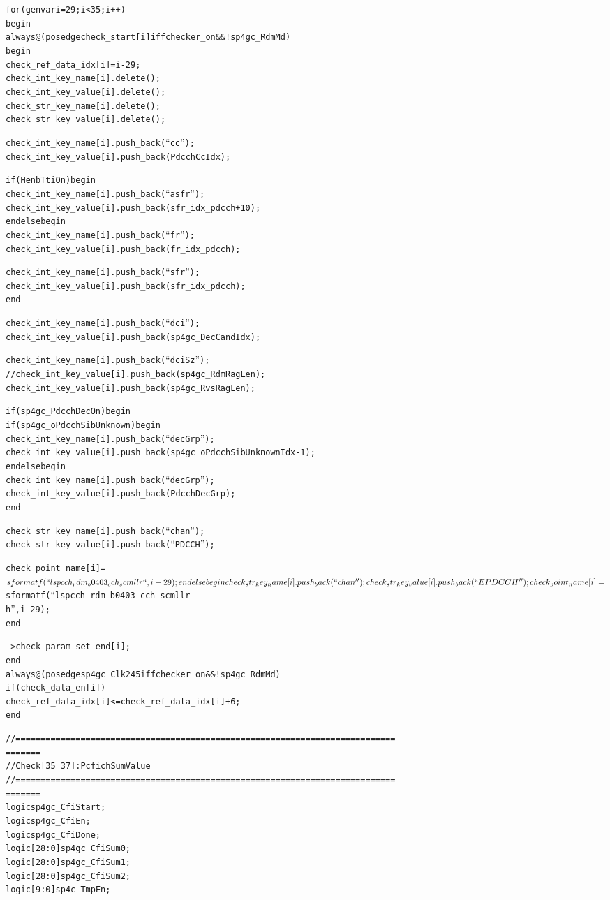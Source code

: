 \documentclass{note}
\begin{document}
\begin{alltt}
  for (genvar i=29;i<35;i++)
  begin
    always@(posedge check_start[i] iff checker_on&&!sp4gc_RdmMd)
    begin
      check_ref_data_idx[i] = i-29;
      check_int_key_name[i].delete();
      check_int_key_value[i].delete();
      check_str_key_name[i].delete();
      check_str_key_value[i].delete();

      check_int_key_name[i].push_back(``cc'');
      check_int_key_value[i].push_back(PdcchCcIdx);

      if (HenbTtiOn) begin
        check_int_key_name[i].push_back(``asfr'');
        check_int_key_value[i].push_back(sfr_idx_pdcch+10);
      end else begin
        check_int_key_name[i].push_back(``fr'');
        check_int_key_value[i].push_back(fr_idx_pdcch);

        check_int_key_name[i].push_back(``sfr'');
        check_int_key_value[i].push_back(sfr_idx_pdcch);
      end

      check_int_key_name[i].push_back(``dci'');
      check_int_key_value[i].push_back(sp4gc_DecCandIdx);

      check_int_key_name[i].push_back(``dciSz'');
      //check_int_key_value[i].push_back(sp4gc_RdmRagLen);
      check_int_key_value[i].push_back(sp4gc_RvsRagLen);

      if (sp4gc_PdcchDecOn) begin
        if (sp4gc_oPdcchSibUnknown) begin
          check_int_key_name[i].push_back(``decGrp'');
          check_int_key_value[i].push_back(sp4gc_oPdcchSibUnknownIdx-1);
        end else begin
          check_int_key_name[i].push_back(``decGrp'');
          check_int_key_value[i].push_back(PdcchDecGrp);
        end

        check_str_key_name[i].push_back(``chan'');
        check_str_key_value[i].push_back(``PDCCH'');

        check_point_name[i]     = $sformatf(``lspcch_rdm_b0403_cch_scmllr%
``,i-29);
      end else begin
        check_str_key_name[i].push_back(``chan'');
        check_str_key_value[i].push_back(``EPDCCH'');

        check_point_name[i]     = $sformatf(``lspcch_rdm_b0403_cch_scmllr%
h'',i-29);
      end

      ->check_param_set_end[i];
    end
    always @ (posedge sp4gc_Clk245 iff checker_on&&!sp4gc_RdmMd)
      if (check_data_en[i])
        check_ref_data_idx[i] <= check_ref_data_idx[i]+6;
  end

  //============================================================================
=======
  // Check [35~37] : Pcfich Sum Value
  //============================================================================
=======
  logic           sp4gc_CfiStart;
  logic           sp4gc_CfiEn;
  logic           sp4gc_CfiDone;
  logic   [28:0]  sp4gc_CfiSum0;
  logic   [28:0]  sp4gc_CfiSum1;
  logic   [28:0]  sp4gc_CfiSum2;
  logic   [ 9:0]  sp4c_TmpEn;


\end{alltt}
\end{document}
